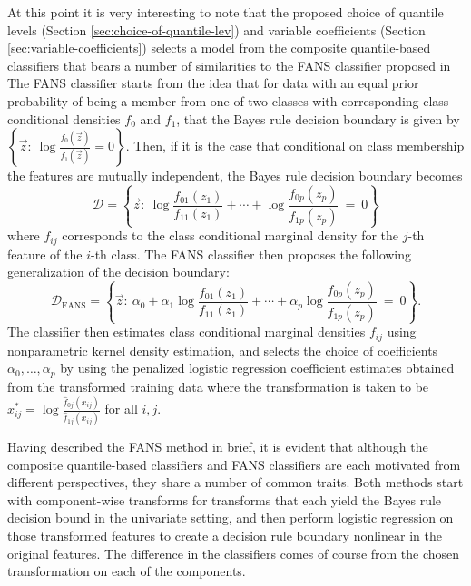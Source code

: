 At this point it is very interesting to note that the proposed choice of
quantile levels (Section \ref{sec:choice-of-quantile-lev}) and variable
coefficients (Section \ref{sec:variable-coefficients}) selects a model from the
composite quantile-based classifiers that bears a number of similarities to the
FANS classifier proposed in \cite{fan2016} The FANS classifier starts from the
idea that for data with an equal prior probability of being a member from one of
two classes with corresponding class conditional densities $f_0$ and $f_1$, that
the Bayes rule decision boundary is given by
$\left\{ \vec{z}{:}~ \log \frac{ f_0(\vec{z}) }{ f_1(\vec{z}) } = 0 \right\}$.
Then, if it is the case that conditional on class membership the features are
mutually independent, the Bayes rule decision boundary becomes
\begin{equation}
  \label{eq:bayes-rule-independent}
  \mathcal{D} = \left\{
    \vec{z} :~
    \log \frac{ f_{01}(z_1) }{ f_{11}(z_1) } +
    \cdots +
    \log \frac{ f_{0p}(z_p) }{ f_{1p}(z_p) }
    ~=~ 0
  \right\}
\end{equation}
where $f_{ij}$ corresponds to the class conditional marginal density for the
$j$-th feature of the $i$-th class.  The FANS classifier then proposes the
following generalization of the decision boundary:
\begin{equation}
  \label{eq:fans-rule}
  \mathcal{D}_{\scriptscriptstyle \text{FANS}} = \left\{
    \vec{z} :~ \alpha_0 + 
    \alpha_1 \log \frac{ f_{01}(z_1) }{ f_{11}(z_1) } +
    \cdots +
    \alpha_p \log \frac{ f_{0p}(z_p) }{ f_{1p}(z_p) }
    ~=~ 0
  \right\}.
\end{equation}
The classifier then estimates class conditional marginal densities $f_{ij}$
using nonparametric kernel density estimation, and selects the choice of
coefficients $\alpha_0, \dots, \alpha_p$ by using the penalized logistic
regression coefficient estimates obtained from the transformed training data
where the transformation is taken to be
$x_{ij}^{*} = \log \frac{ \hat{f}_{0j}(x_{ij}) }{ \hat{f}_{1j}(x_{ij}) }$ for
all $i, j$.

Having described the FANS method in brief, it is evident that although the
composite quantile-based classifiers and FANS classifiers are each motivated
from different perspectives, they share a number of common traits.  Both methods
start with component-wise transforms for transforms that each yield the Bayes
rule decision bound in the univariate setting, and then perform logistic
regression on those transformed features to create a decision rule boundary
nonlinear in the original features.  The difference in the classifiers comes of
course from the chosen transformation on each of the components.

